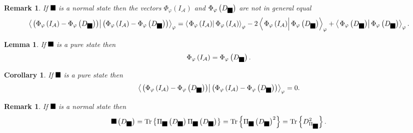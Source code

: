 \documentclass[aps,preprint]{revtex4}%
\providecommand{\U}[1]{\protect\rule{.1in}{.1in}}
\newtheorem{corollary}[theorem]{Corollary}
\newtheorem{lemma}[theorem]{Lemma}
\newtheorem{remark}[theorem]{Remark}
\begin{document}
\begin{remark}
If $\U{3c6} $ is a normal state then the vectors $\Phi_{\varphi}\left(
I_{\mathcal{A}}\right)  $ and $\Phi_{\varphi}\left(  D_{\U{3c6} }\right)  $
are not in general equal
\begin{equation}
\left\langle \left.  \left(  \Phi_{\varphi}\left(  I_{\mathcal{A}}\right)
-\Phi_{\varphi}\left(  D_{\U{3c6} }\right)  \right)  \right\vert \left(
\Phi_{\varphi}\left(  I_{\mathcal{A}}\right)  -\Phi_{\varphi}\left(
D_{\U{3c6} }\right)  \right)  \right\rangle _{\varphi}=\left\langle \left.
\Phi_{\varphi}\left(  I_{\mathcal{A}}\right)  \right\vert \Phi_{\varphi
}\left(  I_{\mathcal{A}}\right)  \right\rangle _{\varphi}-2\left\langle
\left.  \overset{}{\Phi_{\varphi}\left(  I_{\mathcal{A}}\right)  }\right\vert
\Phi_{\varphi}\left(  D_{\U{3c6} }\right)  \right\rangle _{\varphi
}+\left\langle \left.  \Phi_{\varphi}\left(  D_{\U{3c6} }\right)  \right\vert
\Phi_{\varphi}\left(  D_{\U{3c6} }\right)  \right\rangle _{\varphi}.
\end{equation}

\end{remark}

\begin{lemma}
If $\U{3c6} $ is a pure state then
\begin{equation}
\Phi_{\varphi}\left(  I_{\mathcal{A}}\right)  =\Phi_{\varphi}\left(
D_{\U{3c6} }\right)  .
\end{equation}

\end{lemma}

\begin{corollary}
If $\U{3c6} $ is a pure state then%
\begin{equation}
\left\langle \left.  \left(  \Phi_{\varphi}\left(  I_{\mathcal{A}}\right)
-\Phi_{\varphi}\left(  D_{\U{3c6} }\right)  \right)  \right\vert \left(
\Phi_{\varphi}\left(  I_{\mathcal{A}}\right)  -\Phi_{\varphi}\left(
D_{\U{3c6} }\right)  \right)  \right\rangle _{\varphi}=0.
\end{equation}

\end{corollary}

\begin{remark}
If $\U{3c6} $ is a normal state then%
\begin{equation}
\U{3c6} \left(  D_{\U{3c6} }\right)  =\operatorname{Tr}\left\{  \Pi_{\U{3c6}
}\left(  D_{\U{3c6} }\right)  \Pi_{\U{3c6} }\left(  D_{\U{3c6} }\right)
\right\}  =\operatorname{Tr}\left\{  \Pi_{\U{3c6} }\left(  D_{\U{3c6}
}\right)  ^{2}\right\}  =\operatorname{Tr}\left\{  D_{\Pi_{\U{3c6} }}%
^{2}\right\}  .
\end{equation}

\end{remark}
\end{document}
